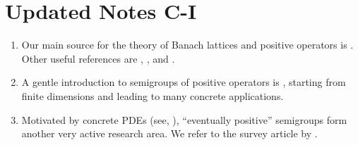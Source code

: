 \section{Updated Notes C-I}
\begin{enumerate}

\item 
Our main source for the theory of Banach lattices and positive operators is .
Other useful references are , , and .

\item
A gentle introduction to  semigroups of positive operators is , starting from finite dimensions and leading to many concrete applications.

\item
Motivated by concrete PDEs (see, \eg {}), \enquote{eventually positive} semigroups form another very active research area.
We refer to the survey article by .
\end{enumerate}




